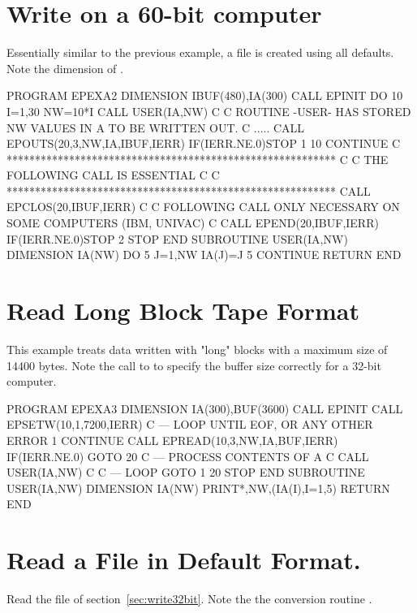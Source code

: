 \section{Write on a 60-bit computer}

Essentially similar to the previous example, a file is
created using all defaults. 
Note the dimension of .

\begin{XMP}
      PROGRAM EPEXA2
      DIMENSION IBUF(480),IA(300)
      CALL EPINIT
      DO 10  I=1,30
      NW=10*I
      CALL USER(IA,NW)
 C
 C   ROUTINE -USER- HAS STORED NW VALUES IN A TO BE WRITTEN OUT.
 C   .....
      CALL EPOUTS(20,3,NW,IA,IBUF,IERR)
      IF(IERR.NE.0)STOP 1
   10 CONTINUE
 C **********************************************************
 C
 C                 THE FOLLOWING CALL IS ESSENTIAL
 C
 C **********************************************************
      CALL EPCLOS(20,IBUF,IERR)
 C
 C    FOLLOWING CALL ONLY NECESSARY ON SOME COMPUTERS (IBM, UNIVAC)
 C
      CALL EPEND(20,IBUF,IERR)
      IF(IERR.NE.0)STOP 2
      STOP
      END
      SUBROUTINE USER(IA,NW)
      DIMENSION IA(NW)
      DO 5 J=1,NW
      IA(J)=J
  5   CONTINUE
      RETURN
      END
\end{XMP}

\newpage

\section{Read Long Block Tape Format}
This example treats data written with "long" blocks
with a maximum size of 14400 bytes. 
Note the call to  to specify
the buffer size correctly for a 32-bit computer.

\begin{XMP}
      PROGRAM EPEXA3
      DIMENSION IA(300),BUF(3600)
      CALL EPINIT
      CALL EPSETW(10,1,7200,IERR)
C --- LOOP UNTIL EOF, OR ANY OTHER ERROR
    1 CONTINUE
      CALL EPREAD(10,3,NW,IA,BUF,IERR)
      IF(IERR.NE.0)  GOTO 20
C --- PROCESS CONTENTS OF A
C
      CALL USER(IA,NW)
C
C --- LOOP
      GOTO 1
   20 STOP
      END
      SUBROUTINE USER(IA,NW)
      DIMENSION IA(NW)
      PRINT*,NW,(IA(I),I=1,5)
      RETURN
      END
\end{XMP}

\section{Read a File in Default Format.}
Read the file of section~\ref{sec:write32bit}.
Note the the conversion routine .

